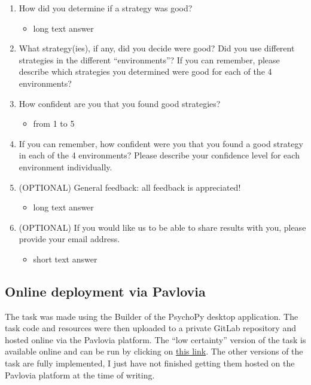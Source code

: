 \documentclass[11pt]{article}
\begin{document}
\begin{enumerate}
\item How did you determine if a strategy was good?
\begin{itemize}
\item long text answer
\end{itemize}
\item What strategy(ies), if any, did you decide were good? Did you use different strategies in the different ``environments''? If you can remember, please describe which strategies you determined were good for each of the 4 environments?
\item How confident are you that you found good strategies?
\begin{itemize}
\item from 1 to 5
\end{itemize}
\item If you can remember, how confident were you that you found a good strategy in each of the 4 environments? Please describe your confidence level for each environment individually.
\item (OPTIONAL) General feedback: all feedback is appreciated!
\begin{itemize}
\item long text answer
\end{itemize}
\item (OPTIONAL) If you would like us to be able to share results with you, please provide your email address.
\begin{itemize}
\item short text answer
\end{itemize}
\end{enumerate}
\subsection{Online deployment via Pavlovia}
\label{sec:org741ad64}
The task was made using the Builder of the PsychoPy desktop application. The task code and resources were then uploaded to a private GitLab repository and hosted online via the Pavlovia platform. The ``low certainty'' version of the task is available online and can be run by clicking on \href{https://run.pavlovia.org/madepass/consequential\_task\_a}{this link}. The other versions of the task are fully implemented, I just have not finished getting them hosted on the Pavlovia platform at the time of writing.
\end{document}
